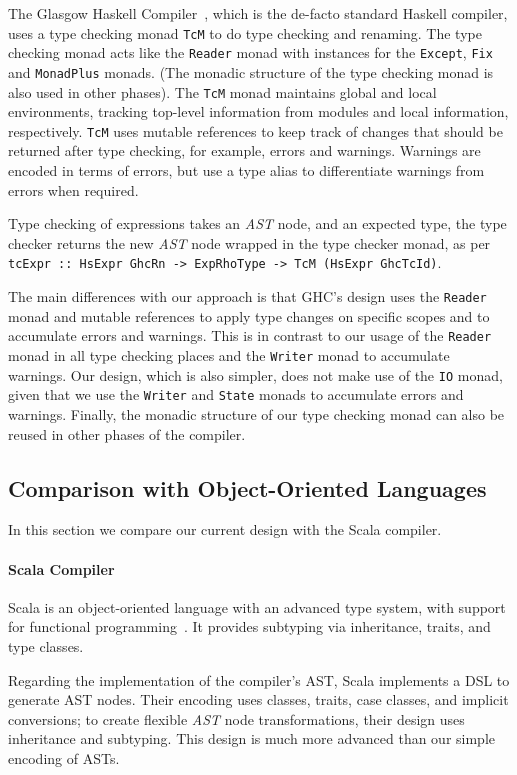 \documentclass[sigplan,screen]{acmart}
\makeatletter
\newcommand{\ec}[1]{\lstinline[style=encore,breaklines=true,basicstyle=\fontsize{9}{9}\tt]@#1@}
\newcommand{\astt}[0]{\textit{AST}}
\makeatother
\begin{document}
The Glasgow Haskell Compiler~\cite{GHC}, which is the de-facto standard Haskell compiler, uses a type checking monad \ec{TcM} to do type checking and renaming.
The type checking monad acts like the \ec{Reader} monad with instances for the \ec{Except},
\ec{Fix} and \texttt{MonadPlus} monads. (The monadic structure of the type checking monad
is also used in other phases).
%
The \ec{TcM} monad maintains global and local environments, tracking
top-level information from modules and local information, respectively.
\ec{TcM} uses mutable references to keep track of changes that
should be returned after type checking, for example,
errors and warnings. Warnings are encoded in terms of errors,
but use a type alias to differentiate warnings from errors when required.

Type checking of expressions takes
an \astt{} node, and an expected type, the type checker returns
the new \astt{} node wrapped in the type checker monad, as per
\ec{tcExpr :: HsExpr GhcRn -> ExpRhoType -> TcM (HsExpr GhcTcId)}.

The main differences with our approach is that GHC's design uses
the \ec{Reader} monad and mutable references to apply type changes on specific
scopes and to accumulate errors and warnings.
This is in contrast to our usage of the \ec{Reader} monad in all type checking places
and the \ec{Writer} monad to accumulate warnings. Our design, which is also simpler,
does not make use of the \ec{IO} monad, given that we use the \ec{Writer}
and \ec{State} monads to accumulate errors and warnings. Finally,
the monadic structure of our type checking monad can also be reused
in other phases of the compiler.

\subsection{Comparison with Object-Oriented Languages}

In this section we compare our current design with
the Scala compiler.

\paragraph{Scala Compiler}
Scala is an object-oriented language with an advanced type system,
with support for functional programming~\cite{scalac}. It provides subtyping via inheritance, traits,
and type classes.

Regarding the implementation of the compiler's AST,
Scala implements a DSL to generate AST nodes.
Their encoding uses classes, traits, case classes, and implicit conversions; to create flexible \astt{} node transformations,
their design uses inheritance and subtyping. This design is much more advanced than
our simple encoding of ASTs.
\end{document}
